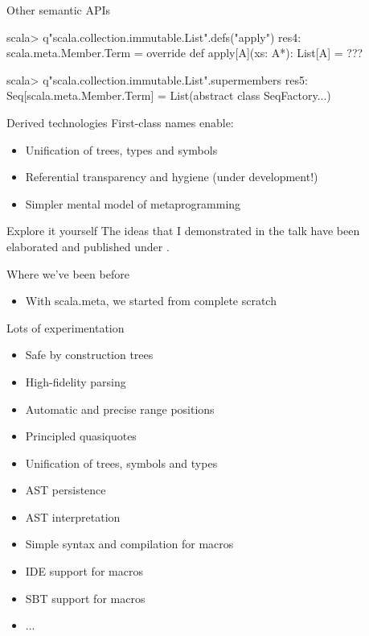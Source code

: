 \documentclass[svgnames,dvipsnames,hyperref={bookmarks=false},usepdftitle=false]{beamer}
\begin{document}
\begin{frame}[fragile]{Other semantic APIs}
\begin{semiverbatim}
scala> q"scala.collection.immutable.List".defs("apply")
res4: scala.meta.Member.Term =
override def apply[A](xs: A*): List[A] = ???

scala> q"scala.collection.immutable.List".supermembers
res5: Seq[scala.meta.Member.Term] =
List(abstract class SeqFactory...)
\end{semiverbatim}
\end{frame}

\begin{frame}{Derived technologies}
First-class names enable:
\begin{itemize}
\item Unification of trees, types and symbols
\item Referential transparency and hygiene (under development!)
\item Simpler mental model of metaprogramming
\end{itemize}
\end{frame}


\begin{frame}{Explore it yourself}
The ideas that I demonstrated in the talk have been elaborated and published under .
\end{frame}


\begin{frame}{Where we've been before}
\begin{itemize}
\item With scala.meta, we started from complete scratch
\end{itemize}
\end{frame}

\begin{frame}{Lots of experimentation}
\begin{itemize}
\item Safe by construction trees
\item High-fidelity parsing
\item Automatic and precise range positions
\item Principled quasiquotes
\item Unification of trees, symbols and types
\item AST persistence
\item AST interpretation
\item Simple syntax and compilation for macros
\item IDE support for macros
\item SBT support for macros
\item ...
\end{itemize}
\end{frame}
\end{document}
